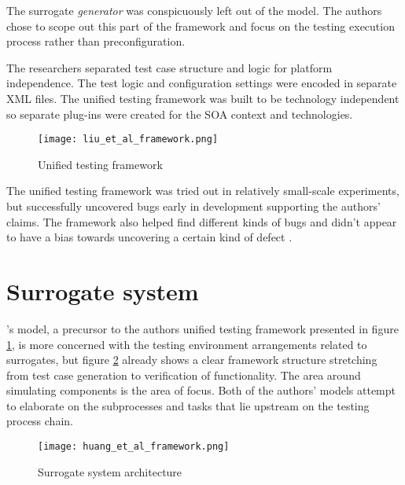\documentclass[12pt,a4paper,oneside,pdftex]{report}
\begin{document}
The surrogate \emph{generator} was conspicuously left out of the model. The authors chose to scope out this part of the framework and focus on the testing execution process rather than preconfiguration.

The researchers separated test case structure and logic for platform independence. The test logic and configuration settings were encoded in separate XML files. The unified testing framework was built to be technology independent so 
separate plug-ins were created for the SOA context and technologies.

\begin{figure}[H]
  \begin{center}
    \texttt{[image: liu\_et\_al\_framework.png]}
    \caption{Unified testing framework \citep{liu2009unified}}
    \label{fig:liu}
  \end{center}
\end{figure}

The unified testing framework was tried out in relatively small-scale experiments, but successfully uncovered bugs early in development supporting the authors' claims. The framework also helped find different kinds of bugs and didn't appear to have a bias towards uncovering a certain kind of defect \citep{liu2009unified}.

\section{Surrogate system}

\citeauthor{huang2008surrogate}'s \citeyearpar{huang2008surrogate} model, a precursor to the authors unified testing framework presented in figure \ref{fig:liu}, is more concerned with the testing environment arrangements related to surrogates, but figure \ref{fig:huang} already shows a clear framework structure stretching from test case generation to verification of functionality. The area around simulating components is the area of focus. Both of the authors' models attempt to elaborate on the subprocesses and tasks that lie upstream on the testing process chain. \citep{huang2008surrogate}

\begin{figure}[H]
  \begin{center}
    \texttt{[image: huang\_et\_al\_framework.png]}
    \caption{Surrogate system architecture \citep{huang2008surrogate}}
    \label{fig:huang}
  \end{center}
\end{figure}
\end{document}
